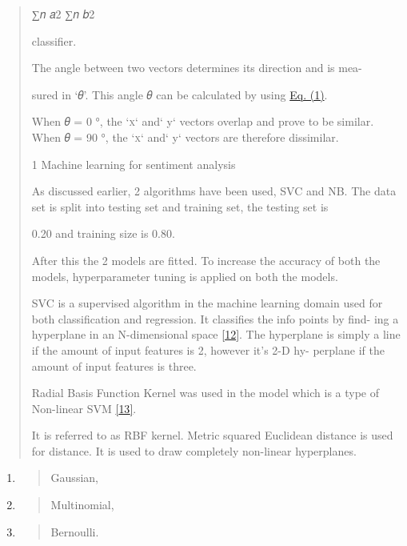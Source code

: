 \documentclass[
]{article}
\begin{document}
\begin{quote}
∑𝑛 𝑎2 ∑𝑛 𝑏2

classiﬁer.

The angle between two vectors determines its direction and is mea-

sured in `𝜃'. This angle 𝜃 can be calculated by using
\protect\hyperlink{_bookmark9}{Eq. (1)}.

When 𝜃 = 0 °, the `\textsc{x}` and` y` vectors overlap and prove to be
similar. When 𝜃 = 90 °, the `\textsc{x}` and` y` vectors are therefore
dissimilar.

1 Machine learning for sentiment analysis

As discussed earlier, 2 algorithms have been used, SVC and NB. The data
set is split into testing set and training set, the testing set is

0.20 and training size is 0.80.

After this the 2 models are ﬁtted. To increase the accuracy of both the
models, hyperparameter tuning is applied on both the models.

SVC is a supervised algorithm in the machine learning domain used
\protect\hypertarget{_bookmark10}{}{}for both classiﬁcation and
regression. It classiﬁes the info points by ﬁnd- ing a hyperplane in an
N-dimensional space \protect\hyperlink{_bookmark32}{{[}12{]}}. The
hyperplane is simply a line if the amount of input features is 2,
however it's 2-D hy- perplane if the amount of input features is three.

Radial Basis Function Kernel was used in the model which is a type of
Non-linear SVM \protect\hyperlink{_bookmark33}{{[}13{]}}.

It is referred to as RBF kernel. Metric squared Euclidean distance is
used for distance. It is used to draw completely non-linear hyperplanes.
\end{quote}

\begin{enumerate}
\def\labelenumi{\arabic{enumi}.}
\item
  \begin{quote}
  Gaussian,
  \end{quote}
\item
  \begin{quote}
  Multinomial,
  \end{quote}
\item
  \begin{quote}
  Bernoulli.
  \end{quote}
\end{enumerate}
\end{document}
